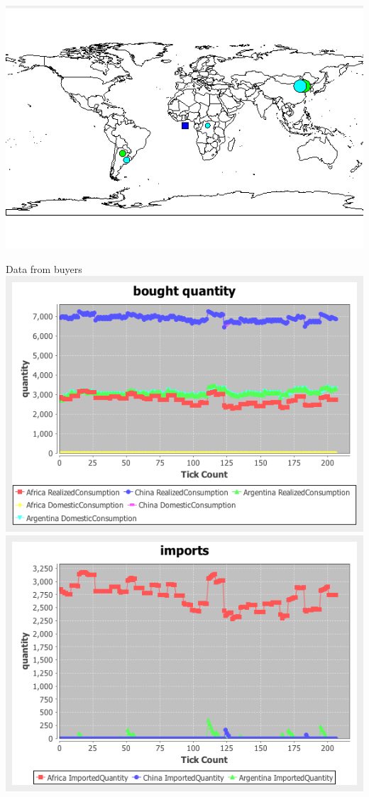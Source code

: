\documentclass{article}
\begin{document}
\vskip2mm
\noindent
\includegraphics[scale=0.6]{fig_case6_map}

\noindent Data from buyers
\vskip2mm
\hskip-2cm
\includegraphics[scale=0.4]{fig_case6_qs}
\includegraphics[scale=0.4]{fig_case6_imports}
\end{document}
